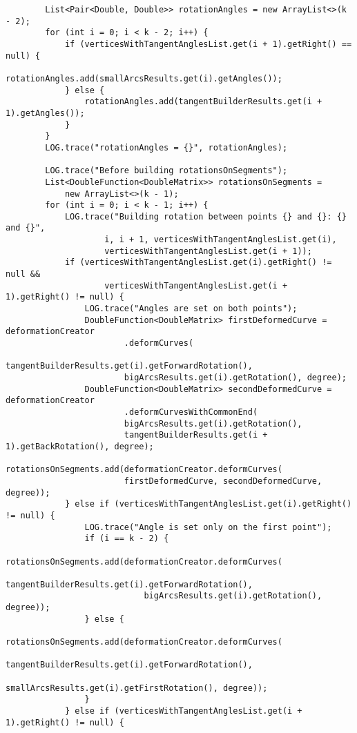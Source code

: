 \begin{verbatim}
        List<Pair<Double, Double>> rotationAngles = new ArrayList<>(k - 2);
        for (int i = 0; i < k - 2; i++) {
            if (verticesWithTangentAnglesList.get(i + 1).getRight() == null) {
                rotationAngles.add(smallArcsResults.get(i).getAngles());
            } else {
                rotationAngles.add(tangentBuilderResults.get(i + 1).getAngles());
            }
        }
        LOG.trace("rotationAngles = {}", rotationAngles);

        LOG.trace("Before building rotationsOnSegments");
        List<DoubleFunction<DoubleMatrix>> rotationsOnSegments =
            new ArrayList<>(k - 1);
        for (int i = 0; i < k - 1; i++) {
            LOG.trace("Building rotation between points {} and {}: {} and {}",
                    i, i + 1, verticesWithTangentAnglesList.get(i),
                    verticesWithTangentAnglesList.get(i + 1));
            if (verticesWithTangentAnglesList.get(i).getRight() != null &&
                    verticesWithTangentAnglesList.get(i + 1).getRight() != null) {
                LOG.trace("Angles are set on both points");
                DoubleFunction<DoubleMatrix> firstDeformedCurve = deformationCreator
                        .deformCurves(
                        tangentBuilderResults.get(i).getForwardRotation(),
                        bigArcsResults.get(i).getRotation(), degree);
                DoubleFunction<DoubleMatrix> secondDeformedCurve = deformationCreator
                        .deformCurvesWithCommonEnd(
                        bigArcsResults.get(i).getRotation(),
                        tangentBuilderResults.get(i + 1).getBackRotation(), degree);
                rotationsOnSegments.add(deformationCreator.deformCurves(
                        firstDeformedCurve, secondDeformedCurve, degree));
            } else if (verticesWithTangentAnglesList.get(i).getRight() != null) {
                LOG.trace("Angle is set only on the first point");
                if (i == k - 2) {
                    rotationsOnSegments.add(deformationCreator.deformCurves(
                            tangentBuilderResults.get(i).getForwardRotation(),
                            bigArcsResults.get(i).getRotation(), degree));
                } else {
                    rotationsOnSegments.add(deformationCreator.deformCurves(
                            tangentBuilderResults.get(i).getForwardRotation(),
                            smallArcsResults.get(i).getFirstRotation(), degree));
                }
            } else if (verticesWithTangentAnglesList.get(i + 1).getRight() != null) {

\end{verbatim}
